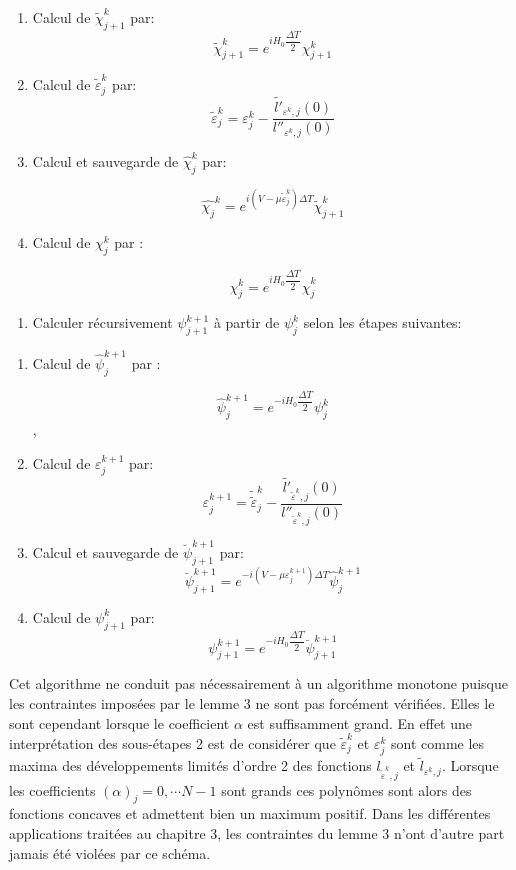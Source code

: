 \begin{enumerate}
	\item Calcul de $\tilde{\chi}_{j+1}^k$ par: $$ \tilde{\chi}_{j+1}^k = e^{iH_0 \dfrac{\Delta T}{2}} \chi_{j+1}^k$$
	
	
	\item Calcul de $\tilde{\varepsilon}_j^k$ par: $$\tilde{\varepsilon}_j^k = \varepsilon_j^k - \dfrac{\tilde{l'}_{\varepsilon^k,j}(0)}{l''_{\varepsilon^k,j}(0)}$$
	
	\item Calcul et sauvegarde de $\widehat{\chi}_j^k$ par:
	
	$$\widehat{\chi_j}^k = e^{i(V-\mu \tilde{\varepsilon}_j^k)\Delta T} \tilde{\chi}_{j+1}^k$$
	\item Calcul de $\chi_j^k$ par :
	
	$$\chi_j^k = e^{i H_0 \dfrac{\Delta T}{2}}\widehat{\chi}_j^k$$
\end{enumerate}

\begin{enumerate}
	\item[\textbullet] Calculer récursivement $\psi_{j+1}^{k+1}$ à partir de $\psi_j^k$ selon les étapes suivantes:
\end{enumerate}
\begin{enumerate}
	\item Calcul de $\widehat{\psi}_j^{k+1}$ par :
	
	$$\widehat{\psi}_j^{k+1} = e^{-i H_0 \dfrac{\Delta T}{2}} \psi_j^k$$,
	\item Calcul de $\varepsilon_j^{k+1}$ par: $$\varepsilon_j^{k+1} = \tilde{\tilde{\varepsilon}}_j^k - \dfrac{\tilde{l'}_{\tilde{\varepsilon}^k,j}(0)}{l''_{\tilde{\varepsilon}^k,j}(0)}$$
	\item Calcul et sauvegarde de $\breve{\psi}_{j+1}^{k+1}$ par:
	$$\breve{\psi}_{j+1}^{k+1} = e^{-i(V-\mu \varepsilon_j^{k+1})\Delta T} \widehat{\psi}_j^{k+1}$$
	\item Calcul de $\psi_{j+1}^k$ par:
	$$\psi_{j+1}^{k+1} = e^{-i H_0 \dfrac{\Delta T}{2}} \breve{\psi}_{j+1}^{k+1}$$
\end{enumerate}

Cet algorithme ne conduit pas nécessairement à un algorithme monotone puisque les contraintes imposées par le lemme 3 ne sont pas forcément vérifiées. Elles le sont cependant lorsque le coefficient $\alpha$ est suffisamment grand. En effet une interprétation des sous-étapes 2 est de considérer que $\tilde{\varepsilon}_j^k$ et $\varepsilon_j^k$ sont comme les maxima des développements limités d'ordre 2 des fonctions $l_{\tilde{\varepsilon}^k,j}$ et $\tilde{l}_{{\varepsilon^k},j}$. Lorsque les coefficients $(\alpha)_j=0, \cdots N-1$ sont grands ces polynômes sont alors des fonctions concaves et admettent bien un maximum positif.
Dans les différentes applications traitées au chapitre 3, les contraintes du lemme 3 n'ont d'autre part jamais été violées par ce schéma.
